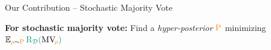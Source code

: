 \documentclass{slides}
\begin{document}
\begin{xframe}{Our Contribution -- {\small Stochastic Majority Vote}}

    \vspace{-0.2cm}

  \begin{figure}
   \centering
   
  \end{figure}

  \vspace{-0.2cm}

  \begin{redbox}{}
  {\bf For stochastic majority vote:} Find a {\it hyper-posterior} $\textcolor{orange}{\mathrm{P}}$ minimizing $\EE_{\Q\sim\hyperQ}\green{\Risk_{\D}(\black{\MVQ})}$
  \end{redbox}

\end{xframe}

\end{document}
